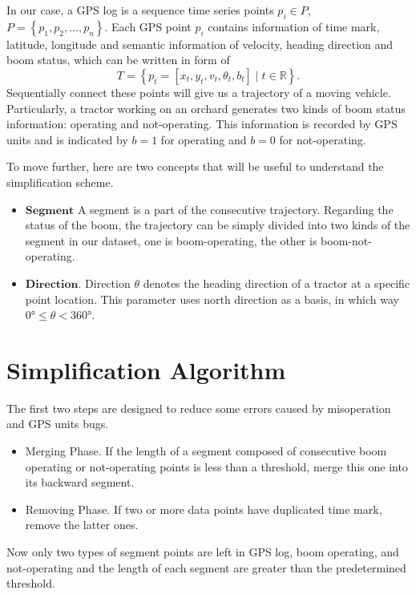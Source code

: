 In our case, a GPS log is a sequence time series points $p_i \in P$, $P=\left\lbrace p_1,p_2, \ldots, p_n \right\rbrace$. Each GPS point $p_i$ contains information of time mark, latitude, longitude and semantic information of velocity, heading direction and boom status, which can be written in form of
\begin{equation}
T=\left\lbrace p_t=[x_t,y_t,v_t,\theta_t,b_t] \mid t \in \mathbb{R} \right\rbrace.
\end{equation}
Sequentially connect these points will give us a trajectory of a moving vehicle.
Particularly, a tractor working on an orchard generates two kinds of boom status information: operating and not-operating. This information is recorded by GPS units and is indicated by $b=1$ for operating and $b=0$ for not-operating.


To move further, here are two concepts that will be useful to understand the simplification scheme.
\begin{itemize}
\item $\mathbf{Segment}$ A segment is a part of the consecutive trajectory. Regarding the status of the boom, the trajectory can be simply divided into two kinds of the segment in our dataset, one is boom-operating, the other is boom-not-operating. 
\item $\mathbf{Direction}$. Direction $\theta$ denotes the heading direction of a tractor at a specific point location. This parameter uses north direction as a basis, in which way $\ang{0} \leq \theta < \ang{360}$.
\end{itemize}



\section{Simplification Algorithm}

The first two steps are designed to reduce some errors caused by misoperation and GPS units bugs.
\begin{itemize}
\item Merging Phase. If the length of a segment composed of consecutive boom operating or not-operating points is less than a threshold, merge this one into its backward segment. 
\item Removing Phase. If two or more data points have duplicated time mark, remove the latter ones. 
\end{itemize}
Now only two types of segment points are left in GPS log, boom operating, and not-operating and the length of each segment are greater than the predetermined threshold.

